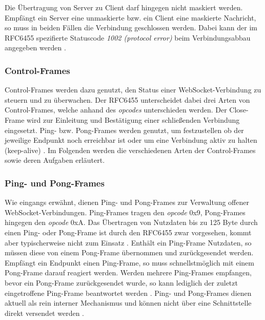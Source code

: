 \documentclass[11pt,a4paper,titlepage]{scrartcl}
\numberwithin{equation}{section}
\begin{document}
\noindent Die Übertragung von Server zu Client darf hingegen nicht maskiert werden. Empfängt ein Server eine unmaskierte bzw. ein Client eine maskierte Nachricht, so muss in beiden Fällen die Verbindung geschlossen werden. Dabei kann der im RFC6455 spezifierte Statuscode \textit{1002 (protocol error)} beim Verbindungsabbau angegeben werden \autocite[26]{fette_websocket_2011}.

\subsubsection{Control-Frames}\label{subsubsec:wsCFrames}
Control-Frames werden dazu genutzt, den Status einer WebSocket-Verbindung zu steuern und zu überwachen. Der RFC6455 unterscheidet dabei drei Arten von Control-Frames, welche anhand des \textit{opcodes} unterschieden werden. Der Close-Frame wird zur Einleitung und Bestätigung einer schließenden Verbindung eingesetzt. Ping- bzw. Pong-Frames werden genutzt, um festzustellen ob der jeweilige Endpunkt noch erreichbar ist oder um eine Verbindung aktiv zu halten (keep-alive) \autocite[35-36]{fette_websocket_2011}. Im Folgenden werden die verschiedenen Arten der Control-Frames sowie deren Aufgaben erläutert.

\subsubsection*{Ping- und Pong-Frames}
Wie eingangs erwähnt, dienen Ping- und Pong-Frames zur Verwaltung offener WebSocket-Verbindungen. Ping-Frames tragen den \textit{opcode} 0x9, Pong-Frames hingegen den \textit{opcode} 0xA. Das Übertragen von Nutzdaten bis zu 125 Byte durch einen Ping- oder Pong-Frame ist durch den RFC6455 zwar vorgesehen, kommt aber typischerweise nicht zum Einsatz \autocite[48]{gorski_websockets_2015}. Enthält ein Ping-Frame Nutzdaten, so müssen diese von einem Pong-Frame übernommen und zurückgesendet werden. Empfängt ein Endpunkt einen Ping-Frame, so muss schnellstmöglich mit einem Pong-Frame darauf reagiert werden. Werden mehrere Ping-Frames empfangen, bevor ein Pong-Frame zurückgesendet wurde, so kann lediglich der zuletzt eingetroffene Ping-Frame beantwortet werden \autocite[36]{fette_websocket_2011}. Ping- und Pong-Frames dienen aktuell als rein interner Mechanismus und können nicht über eine Schnittstelle direkt versendet werden \autocite[49]{gorski_websockets_2015}.\\
\end{document}
